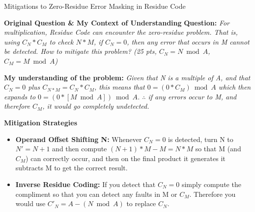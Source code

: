 \documentclass[aspectratio=169]{beamer}
\begin{document}
\begin{frame}{Mitigations to Zero-Residue Error Masking in Residue Code}

  \begin{block}{\textbf{Original Question \& My Context of Understanding}}
    \small
    \textbf{Question:} \textit{For multiplication, Residue Code can encounter the
      zero-residue problem. That is, using $C_N*C_M$ to check $N*M$, if $C_N=0$, then any error that occurs in
      M cannot be detected. How to mitigate this problem? (25 pts, $C_N = N \bmod A$, $C_M = M \bmod A$)
    }
    \vspace{0.1cm}

    \textbf{My understanding of the problem:} \textit{Given that N is a multiple of A, and that $C_N = 0$ plus $C_{N*M} = C_N*C_M$,
      this means that $0 = (0*C_M) \bmod A$ which then expands to $0 = (0*[M \bmod A]) \bmod A$. $\therefore$ if
      any errors occur to M, and therefore $C_M$, it would go completely undetected.
    }
  \end{block}

  \vspace{0.15cm}

  \begin{exampleblock}{\textbf{Mitigation Strategies}}
    \small
    \begin{itemize}\footnotesize
      \item \textbf{Operand Offset Shifting N:} Whenever $C_N = 0$ is detected, turn N to $N' = N + 1$ and then
        compute $(N + 1)*M - M = N*M$ so that M (and $C_M$) can correctly occur, and then on the final product it
        generates it subtracts M to get the correct result.
      \item \textbf{Inverse Residue Coding:} If you detect that $C_N = 0$ simply compute the compliment so
        that you can detect any faults in M or $C_M$. Therefore you would use $C'_N = A - (N \bmod A)$ to replace 
        $C_N$.
    \end{itemize}
  \end{exampleblock}

\end{frame}
\end{document}
